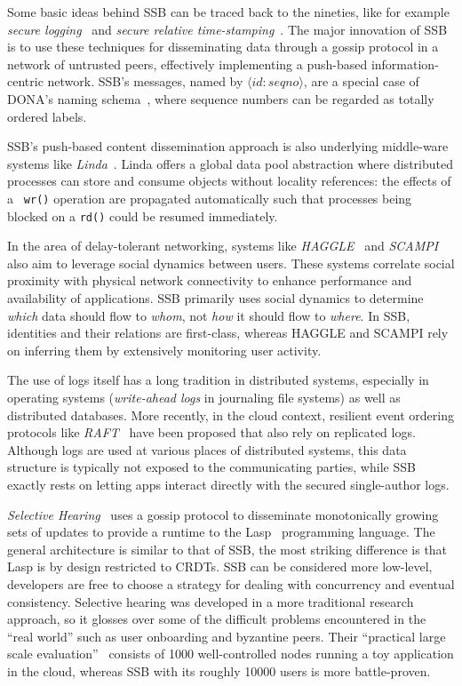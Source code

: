 \documentclass[9pt,sigconf]{acmart}
\begin{document}
Some basic ideas behind SSB can be traced back to the nineties, like
for example {\em secure logging}~\cite{schneier1998cryptographic} and
{\em secure relative time-stamping}~\cite{haber1990time}. The major
innovation of SSB is to use these techniques for disseminating data
through a gossip protocol in a network of untrusted peers, effectively
implementing a push-based information-centric network. SSB's messages,
named by $\langle id:seqno\rangle$, are a special case of DONA's
naming schema~\cite{Koponen:2007:DNA:1282380.1282402}, where sequence
numbers can be regarded as totally ordered labels.

SSB's push-based content dissemination approach is also underlying
middle-ware systems like {\em
  Linda}~\cite{Gelernter:1985:GCL:2363.2433}. Linda offers a global
data pool abstraction where distributed processes can store and
consume objects without locality references: the effects of a {\tt
  wr()} operation are propagated automatically such that processes
being blocked on a {\tt rd()} could be resumed immediately.

In the area of delay-tolerant networking, systems like {\em
  HAGGLE}~\cite{scott2006haggle} and {\em
  SCAMPI}~\cite{pitkanen2012scampi} also aim to leverage social
dynamics between users. These systems correlate social proximity with
physical network connectivity to enhance performance and availability
of applications. SSB primarily uses social dynamics to determine {\em
  which} data should flow to {\em whom}, not {\em how} it should flow
to {\em where}. In SSB, identities and their relations are
first-class, whereas HAGGLE and SCAMPI rely on inferring them by
extensively monitoring user activity.

The use of logs itself has a long tradition in distributed systems,
especially in operating systems (\textit{write-ahead logs} in
journaling file systems) as well as distributed databases. More
recently, in the cloud context, resilient event ordering protocols
like {\em RAFT}~\cite{DBLP:conf/usenix/OngaroO14} have been proposed
that also rely on replicated logs. Although logs are used at various
places of distributed systems, this data structure is typically not
exposed to the communicating parties, while SSB exactly rests on
letting apps interact directly with the secured single-author logs.

\textit{Selective Hearing}~\cite{meiklejohn2015selective} uses a
gossip protocol to disseminate monotonically growing sets of updates
to provide a runtime to the Lasp~\cite{meiklejohn2015lasp} programming
language. The general architecture is similar to that of SSB, the most
striking difference is that Lasp is by design restricted to CRDTs. SSB
can be considered more low-level, developers are free to choose a
strategy for dealing with concurrency and eventual
consistency. Selective hearing was developed in a more traditional
research approach, so it glosses over some of the difficult problems
encountered in the ``real world'' such as user onboarding and
byzantine peers. Their ``practical large scale
evaluation''~\cite{meiklejohn2017lasp} consists of 1000
well-controlled nodes running a toy application in the cloud, whereas
SSB with its roughly 10000 users is more battle-proven.
\end{document}
